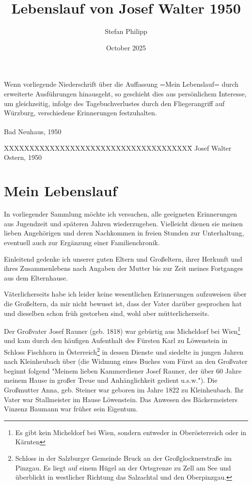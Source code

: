 \documentclass[a4paper,11pt]{article}
\title{Lebenslauf von Josef Walter 1950}
\author{Stefan Philipp}
\date{October 2025}
\begin{document}
Wenn vorliegende Niederschrift über die Auffassung =Mein Lebenslauf= durch erweiterte Ausführungen hinausgeht, so geschieht dies aus persönlichem Interesse, um gleichzeitig, infolge des Tagebuchverlustes durch den Fliegerangriff auf Würzburg, verschiedene Erinnerungen festzuhalten.
\\
\\
\noindent Bad Neuhaus, 1950
\newpage
  \begin{tabbing}
XXXXXXXXXXXXXXXXXXXXXXXXXXXXXXXXXXXXX\= \kill
Josef Walter \>Ostern, 1950 \\
  \end{tabbing}

\section*{Mein Lebenslauf}

In vorliegender Sammlung möchte ich versuchen, alle geeigneten Erinnerungen aus Jugendzeit und späteren Jahren wiederzugeben. Vielleicht dienen sie meinen lieben Angehörigen und deren Nachkommen in freien Stunden zur Unterhaltung, eventuell auch zur Ergänzung einer Familienchronik.

Einleitend gedenke ich unserer guten Eltern und Großeltern, ihrer Herkunft und ihres Zusammenlebens nach Angaben der Mutter bis zur Zeit meines Fortganges aus dem Elternhause.

Väterlicherseits habe ich leider keine wesentlichen Erinnerungen aufzuweisen über die Großeltern, da mir nicht bewusst ist, dass der Vater darüber gesprochen hat und dieselben schon früh gestorben sind, wohl aber mütterlicherseits.

Der Großvater Josef Rauner (geb. 1818) war gebürtig aus Micheldorf bei Wien\footnote{Es gibt kein Micheldorf bei Wien, sondern entweder in Oberösterreich oder in Kärnten} und kam durch den häufigen Aufenthalt des Fürsten Karl zu Löwenstein in Schloss Fischhorn in Österreich\footnote{Schloss in der Salzburger Gemeinde Bruck an der Großglocknerstraße im Pinzgau. Es liegt auf einem Hügel an der Ortsgrenze zu Zell am See und überblickt in westlicher Richtung das Salzachtal und den Oberpinzgau.} in dessen Dienste und siedelte in jungen Jahren nach Kleinheubach über (die Widmung eines Buches vom Fürst an den Großvater beginnt folgend "Meinem lieben Kammerdiener Josef Rauner, der über 60 Jahre meinem Hause in großer Treue und Anhänglichkeit gedient u.s.w."). Die Großmutter Anna, geb. Steiner war geboren im Jahre 1822 zu Kleinheubach. Ihr Vater war Stallmeister im Hause Löwenstein. Das Anwesen des Bäckermeisters Vinzenz Baumann war früher sein Eigentum.
\end{document}
